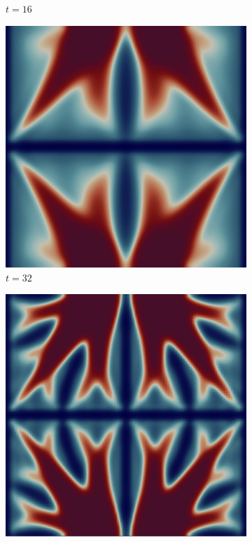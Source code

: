 \begin{figure}[H]
\begin{subfigure}{.4\textwidth}
        \caption{$t = 16$}
    \end{subfigure}
    \begin{subfigure}{.4\textwidth}
        \includegraphics[width=\textwidth]{imgs/UnitSquare2/third.png}
        \caption{$t = 32$}
    \end{subfigure}
    \begin{subfigure}{.4\textwidth}
        \includegraphics[width=\textwidth]{imgs/UnitSquare2/fourth.png}

\end{subfigure}
\end{figure}
